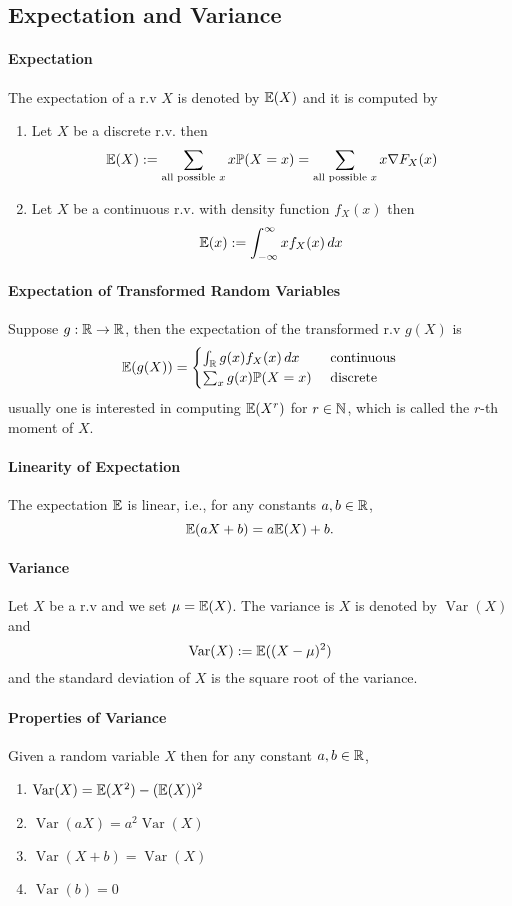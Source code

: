 \subsection{Expectation and Variance}
\paragraph{Expectation}
The expectation of a r.v \(X\) is denoted by \(\mathbb{E}(X)\) and it is computed by 
\begin{enumerate}
    \item Let \(X\) be a discrete r.v. then 
    \[\mathbb{E}(X) := \sum_{\text{all possible } x} x\mathbb{P}(X = x) = \sum_{\text{all possible } x} x\nabla F_X(x)\]
    \item Let \(X\) be a continuous r.v. with density function \(f_X(x)\) then
    \[\mathbb{E}(x) := \int_{-\infty}^\infty xf_X(x) \, dx\]
\end{enumerate}

\paragraph{Expectation of Transformed Random Variables}
Suppose \(g: \mathbb{R} \to \mathbb{R}\), then the expectation of the transformed r.v \(g(X)\) is 
\[\mathbb{E}(g(X)) = \begin{cases}
    \int_{\mathbb{R}} g(x)f_X(x) \, dx & \text{ continuous} \\
    \sum_x g(x)\mathbb{P}(X = x) & \text{ discrete}
\end{cases}
\]
usually one is interested in computing \(\mathbb{E}(X^r)\) for \(r \in \mathbb{N}\), which is called the \(r\)-th moment of \(X\).

\paragraph{Linearity of Expectation}
The expectation \(\mathbb{E}\) is linear, i.e., for any constants \(a,b \in \mathbb{R}\),
\[\mathbb{E}(aX + b) = a\mathbb{E}(X) + b.\]

\paragraph{Variance}
Let \(X\) be a r.v and we set \(\mu = \mathbb{E}(X)\). The variance is \(X\) is denoted by \(\operatorname{Var}(X)\) and 
\[\operatorname{Var}(X) := \mathbb{E}((X - \mu)^2)\]
and the standard deviation of \(X\) is the square root of the variance.

\paragraph{Properties of Variance}
Given a random variable \(X\) then for any constant \(a,b \in \mathbb{R}\),
\begin{enumerate}
    \item \(\operatorname{Var}(X) = \mathbb{E}(X^2) - (\mathbb{E}(X))^2\)
    \item \(\operatorname{Var}(aX) = a^2\operatorname{Var}(X)\)
    \item \(\operatorname{Var}(X + b) = \operatorname{Var}(X)\)
    \item \(\operatorname{Var}(b) = 0\)
\end{enumerate}

